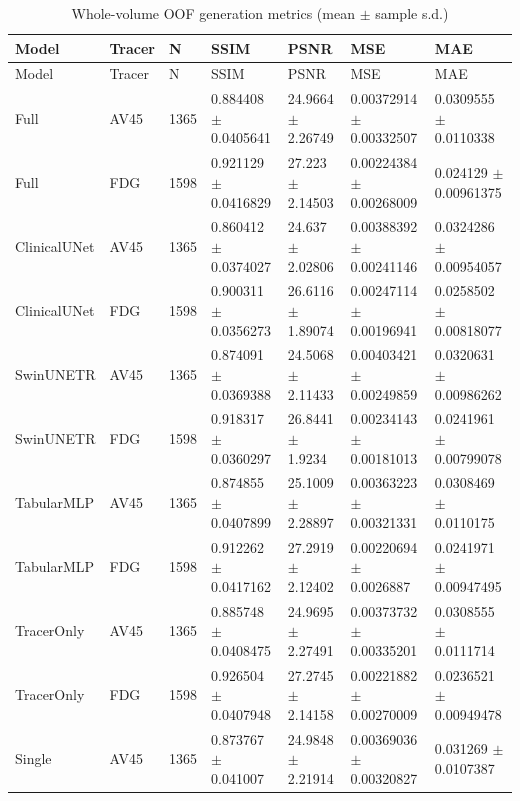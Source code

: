 \documentclass{article}
\begin{document}
\begin{landscape}
\begingroup
\footnotesize
\setlength{\tabcolsep}{4pt}
\begin{longtable}{lllllll}
\caption{Whole-volume OOF generation metrics (mean $\pm$ sample s.d.)}\label{tab:whole_volume_generation}\\
\toprule
Model & Tracer & N & SSIM & PSNR & MSE & MAE \\
\midrule
\endfirsthead
\toprule
Model & Tracer & N & SSIM & PSNR & MSE & MAE \\
\midrule
\endhead
\bottomrule
\endfoot
Full & AV45 & 1365 & 0.884408 \(\pm\) 0.0405641 & 24.9664 \(\pm\) 2.26749 & 0.00372914 \(\pm\) 0.00332507 & 0.0309555 \(\pm\) 0.0110338 \\
Full & FDG & 1598 & 0.921129 \(\pm\) 0.0416829 & 27.223 \(\pm\) 2.14503 & 0.00224384 \(\pm\) 0.00268009 & 0.024129 \(\pm\) 0.00961375 \\
ClinicalUNet & AV45 & 1365 & 0.860412 \(\pm\) 0.0374027 & 24.637 \(\pm\) 2.02806 & 0.00388392 \(\pm\) 0.00241146 & 0.0324286 \(\pm\) 0.00954057 \\
ClinicalUNet & FDG & 1598 & 0.900311 \(\pm\) 0.0356273 & 26.6116 \(\pm\) 1.89074 & 0.00247114 \(\pm\) 0.00196941 & 0.0258502 \(\pm\) 0.00818077 \\
SwinUNETR & AV45 & 1365 & 0.874091 \(\pm\) 0.0369388 & 24.5068 \(\pm\) 2.11433 & 0.00403421 \(\pm\) 0.00249859 & 0.0320631 \(\pm\) 0.00986262 \\
SwinUNETR & FDG & 1598 & 0.918317 \(\pm\) 0.0360297 & 26.8441 \(\pm\) 1.9234 & 0.00234143 \(\pm\) 0.00181013 & 0.0241961 \(\pm\) 0.00799078 \\
TabularMLP & AV45 & 1365 & 0.874855 \(\pm\) 0.0407899 & 25.1009 \(\pm\) 2.28897 & 0.00363223 \(\pm\) 0.00321331 & 0.0308469 \(\pm\) 0.0110175 \\
TabularMLP & FDG & 1598 & 0.912262 \(\pm\) 0.0417162 & 27.2919 \(\pm\) 2.12402 & 0.00220694 \(\pm\) 0.0026887 & 0.0241971 \(\pm\) 0.00947495 \\
TracerOnly & AV45 & 1365 & 0.885748 \(\pm\) 0.0408475 & 24.9695 \(\pm\) 2.27491 & 0.00373732 \(\pm\) 0.00335201 & 0.0308555 \(\pm\) 0.0111714 \\
TracerOnly & FDG & 1598 & 0.926504 \(\pm\) 0.0407948 & 27.2745 \(\pm\) 2.14158 & 0.00221882 \(\pm\) 0.00270009 & 0.0236521 \(\pm\) 0.00949478 \\
Single & AV45 & 1365 & 0.873767 \(\pm\) 0.041007 & 24.9848 \(\pm\) 2.21914 & 0.00369036 \(\pm\) 0.00320827 & 0.031269 \(\pm\) 0.0107387 \\

\end{longtable}
\end{landscape}
\end{document}
